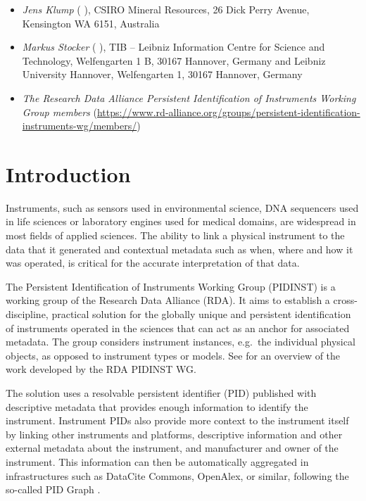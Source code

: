 \documentclass[titlepage=true,twoside=false,DIV=13]{scrartcl}
\begin{document}
\begin{itemize}
   ),
  MARUM - Center for Marine Environmental Sciences, University of Bremen,
  Leobener Str.\ 8, 28359 Bremen, Germany
\item \emph{Jens Klump}
  (\href{mailto:jens.klump@csiro.au}{\Letter}
   ),
  CSIRO Mineral Resources, 26 Dick Perry Avenue, Kensington WA 6151,
  Australia
\item \emph{Markus Stocker}
  (\href{mailto:markus.stocker@tib.eu}{\Letter}
    ),
  TIB -- Leibniz Information Centre for Science and Technology,
  Welfengarten 1 B, 30167 Hannover, Germany and
  Leibniz University Hannover, Welfengarten 1, 30167 Hannover, Germany
\item \emph{The Research Data Alliance Persistent Identification of Instruments
  Working Group members}
  ({\small \url{https://www.rd-alliance.org/groups/persistent-identification-instruments-wg/members/}})
\end{itemize}

\newpage
\tableofcontents
\cleardoublepage
{}

\section{Introduction}
\label{intro}

Instruments, such as sensors used in environmental science, DNA
sequencers used in life sciences or laboratory engines used for
medical domains, are widespread in most fields of applied sciences.
The ability to link a physical instrument to the data that it
generated and contextual metadata such as when, where and how it was
operated, is critical for the accurate interpretation of that data.

The Persistent Identification of Instruments Working Group (PIDINST)
is a working group of the Research Data Alliance (RDA).  It aims to
establish a cross-discipline, practical solution for the globally
unique and persistent identification of instruments operated in the
sciences that can act as an anchor for associated metadata.  The group
considers instrument instances, e.g.\ the individual physical objects,
as opposed to instrument types or models.  See \cite{pidinst2020} for
an overview of the work developed by the RDA PIDINST WG.

The solution uses a resolvable persistent identifier (PID) published
with descriptive metadata that provides enough information to identify
the instrument.  Instrument PIDs also provide more context to the
instrument itself by linking other instruments and platforms,
descriptive information and other external metadata about the
instrument, and manufacturer and owner of the instrument.  This
information can then be automatically aggregated in infrastructures
such as DataCite Commons, OpenAlex, or similar, following the
so-called PID Graph \cite{pidgraph2021}.
\end{document}
